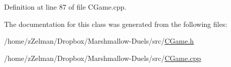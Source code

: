 Definition at line 87 of file C\-Game.\-cpp.



The documentation for this class was generated from the following files\-:\begin{DoxyCompactItemize}
\item 
/home/z\-Zelman/\-Dropbox/\-Marshmallow-\/\-Duels/src/\hyperlink{CGame_8h}{C\-Game.\-h}\item 
/home/z\-Zelman/\-Dropbox/\-Marshmallow-\/\-Duels/src/\hyperlink{CGame_8cpp}{C\-Game.\-cpp}\end{DoxyCompactItemize}
